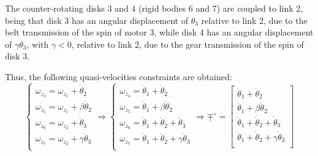 \documentclass[a4paper,11pt,brazil,fleqn]{article}
\begin{document}
The counter-rotating disks 3 and 4 (rigid bodies 6 and 7) are coupled to link 2, being that disk 3 has an angular displacement of $\theta_3$ relative to link 2, due to the belt transmission of the spin of motor 3, while disk 4 has an angular displacement of $\gamma\theta_3$, with $\gamma < 0$, relative to link 2, due to the gear transmission of the spin of disk 3.

Thus, the following quasi-velocities constraints are obtained:
\begin{equation}\label{eq:Quasi-velocitiesConstraints1}
\begin{cases}
\omega_{z_4} = \omega_{z_1} + \dot{\theta}_2 \\
\omega_{z_5} = \omega_{z_1} + \beta\dot{\theta}_2 \\
\omega_{z_6} = \omega_{z_2} + \dot{\theta}_3 \\
\omega_{z_7} = \omega_{z_2} + \gamma\dot{\theta}_3 \\
\end{cases}
\Rightarrow
\begin{cases}
\omega_{z_4} = \dot{\theta}_1 + \dot{\theta}_2 \\
\omega_{z_5} = \dot{\theta}_1 + \beta\dot{\theta}_2 \\
\omega_{z_6} = \dot{\theta}_1 + \dot{\theta}_2 + \dot{\theta}_3 \\
\omega_{z_7} = \dot{\theta}_1 + \dot{\theta}_2 + \gamma\dot{\theta}_3 \\
\end{cases}
\Rightarrow
\underline{\mp}^\circ = 
\begin{bmatrix}
\dot{\theta}_1 + \dot{\theta}_2 \\
\dot{\theta}_1 + \beta\dot{\theta}_2 \\
\dot{\theta}_1 + \dot{\theta}_2 + \dot{\theta}_3 \\
\dot{\theta}_1 + \dot{\theta}_2 + \gamma\dot{\theta}_3 \\
\end{bmatrix}
\end{equation}
\end{document}
